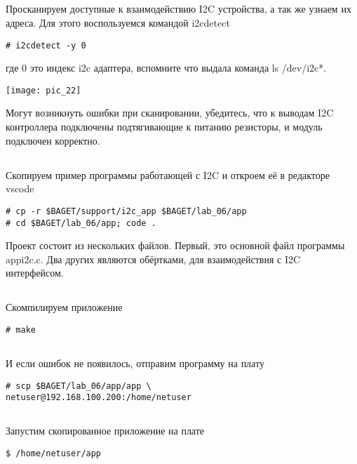 \subsection{}Просканируем доступные к взаимодействию I2C устройства, а так же узнаем их адреса. Для этого воспользуемся командой i2cdetect
\begin{lstlisting}[style=bash]
# i2cdetect -y 0
\end{lstlisting}
где 0 это индекс i2c адаптера, вспомните что выдала команда ls /dev/i2c*.

\begin{center}
	\texttt{[image: pic\_22]}
\end{center}

Могут возникнуть ошибки при сканировании, убедитесь, что к выводам I2C контроллера подключены подтягивающие к питанию резисторы, и модуль подключен корректно.


\subsection{}Скопируем пример программы работающей с I2C и откроем её в редакторе vscode
\begin{lstlisting}[style=bash]
# cp -r $BAGET/support/i2c_app $BAGET/lab_06/app
# cd $BAGET/lab_06/app; code .
\end{lstlisting}

Проект состоит из нескольких файлов. Первый, это основной файл программы appi2c.c. Два других являются обёртками, для взаимодействия с I2C интерфейсом.

\subsection{}Скомпилируем приложение
\begin{lstlisting}[style=bash]
# make
\end{lstlisting}

\subsection{}И если ошибок не появилось, отправим программу на плату
\begin{lstlisting}[style=bash]
# scp $BAGET/lab_06/app/app \
netuser@192.168.100.200:/home/netuser
\end{lstlisting}

\subsection{}Запустим скопированное приложение на плате
\begin{lstlisting}[style=bash]
$ /home/netuser/app
\end{lstlisting}

